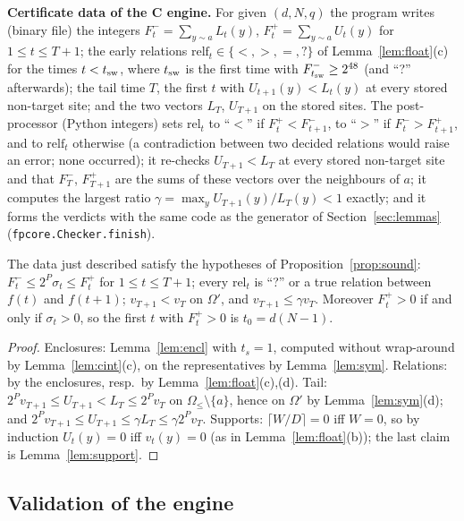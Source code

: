 \textbf{Certificate data of the C engine.} For given $(d,N,q)$ the program writes (binary file) the integers $F^-_t=\sum_{y\sim a}L_t(y)$, $F^+_t=\sum_{y\sim a}U_t(y)$ for $1\le t\le T+1$; the early relations $\mathrm{relf}_t\in\{<,>,=,?\}$ of Lemma~\ref{lem:float}(c) for the times $t<t_{\rm sw}$, where $t_{\rm sw}$ is the first time with $F^-_{t_{\rm sw}}\ge2^{48}$ (and ``?'' afterwards); the tail time $T$, the first $t$ with $U_{t+1}(y)<L_t(y)$ at every stored non-target site; and the two vectors $L_T$, $U_{T+1}$ on the stored sites. The post-processor (Python integers) sets $\mathrm{rel}_t$ to ``$<$'' if $F^+_t<F^-_{t+1}$, to ``$>$'' if $F^-_t>F^+_{t+1}$, and to $\mathrm{relf}_t$ otherwise (a contradiction between two decided relations would raise an error; none occurred); it re-checks $U_{T+1}<L_T$ at every stored non-target site and that $F^-_T$, $F^+_{T+1}$ are the sums of these vectors over the neighbours of $a$; it computes the largest ratio $\gamma=\max_yU_{T+1}(y)/L_T(y)<1$ exactly; and it forms the verdicts with the same code as the generator of Section~\ref{sec:lemmas} (\texttt{fpcore.Checker.finish}).

\begin{proposition}\label{prop:soundC}
The data just described satisfy the hypotheses of Proposition~\ref{prop:sound}: $F^-_t\le2^P\sigma_t\le F^+_t$ for $1\le t\le T+1$; every $\mathrm{rel}_t$ is ``?'' or a true relation between $f(t)$ and $f(t+1)$; $v_{T+1}<v_T$ on $\Omega'$, and $v_{T+1}\le\gamma v_T$. Moreover $F^+_t>0$ if and only if $\sigma_t>0$, so the first $t$ with $F^+_t>0$ is $t_0=d(N-1)$.
\end{proposition}
\begin{proof}
Enclosures: Lemma~\ref{lem:encl} with $t_s=1$, computed without wrap-around by Lemma~\ref{lem:cint}(c), on the representatives by Lemma~\ref{lem:sym}. Relations: by the enclosures, resp.\ by Lemma~\ref{lem:float}(c),(d). Tail: $2^Pv_{T+1}\le U_{T+1}<L_T\le2^Pv_T$ on $\Omega_\le\setminus\{a\}$, hence on $\Omega'$ by Lemma~\ref{lem:sym}(d); and $2^Pv_{T+1}\le U_{T+1}\le\gamma L_T\le\gamma2^Pv_T$. Supports: $\lceil W/D\rceil=0$ iff $W=0$, so by induction $U_t(y)=0$ iff $v_t(y)=0$ (as in Lemma~\ref{lem:float}(b)); the last claim is Lemma~\ref{lem:support}.
\end{proof}

\subsection{Validation of the engine}

